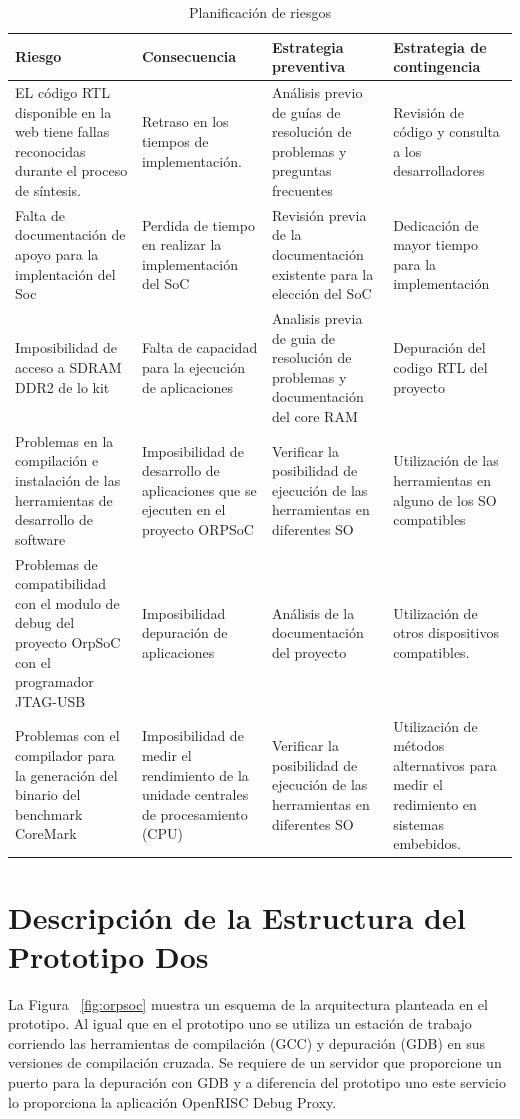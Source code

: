  		\begin{table}[h!]
		\centering
		\begin{tabular}{ p{4cm} p{4cm} p{4cm} p{3cm} }
		\hline 
		\rowcolor[gray]{0.8} Riesgo & Consecuencia & Estrategia preventiva & Estrategia de contingencia\\
		\hline
		EL código RTL disponible en la web tiene fallas reconocidas durante el proceso de síntesis.&Retraso en los tiempos de implementación.& Análisis previo de guías de resolución de problemas y preguntas frecuentes & Revisión de código y consulta a los desarrolladores \\		 
		\hline
		Falta de documentación de apoyo para la implentación
del Soc& Perdida de tiempo en realizar la implementación
del SoC & Revisión previa de la documentación existente para la elección del
SoC & Dedicación de mayor tiempo para la implementación\\ 
		\hline
		 Imposibilidad de acceso a SDRAM DDR2 de lo kit & Falta de capacidad para la ejecución de aplicaciones & Analisis previa de guia de resolución de problemas y documentación del core RAM & Depuración del codigo RTL del proyecto\\
		\hline
		Problemas en la compilación e instalación de las herramientas de desarrollo de software & Imposibilidad de desarrollo de aplicaciones que se ejecuten en el proyecto ORPSoC & Verificar la posibilidad de ejecución de las herramientas en diferentes SO & Utilización de las herramientas en alguno de los SO compatibles\\			
		\hline
		Problemas de compatibilidad con el modulo de debug del proyecto OrpSoC con el programador JTAG-USB & Imposibilidad depuración de aplicaciones &Análisis de la documentación del proyecto& Utilización de otros  dispositivos compatibles.\\		
		\hline
		Problemas con el compilador para la generación del binario del benchmark CoreMark & Imposibilidad de medir el rendimiento de la unidade centrales de procesamiento (CPU) & Verificar la posibilidad de ejecución de las herramientas en diferentes SO & Utilización de métodos alternativos para medir el redimiento en sistemas embebidos.\\
		\hline
		\end{tabular}
		\caption{Planificación de riesgos}
		\end{table}


\newpage
		\section{Descripción de la Estructura del Prototipo Dos}
		La Figura ~\ref{fig:orpsoc} muestra un esquema de la arquitectura planteada en el prototipo. Al igual que en el prototipo uno se utiliza un estación
		de trabajo corriendo las herramientas de compilación (GCC) y depuración (GDB) en sus versiones de compilación cruzada. Se requiere de un servidor
		que proporcione un puerto para la depuración con GDB y a diferencia del prototipo uno este servicio lo proporciona la aplicación OpenRISC Debug
		Proxy.
		
